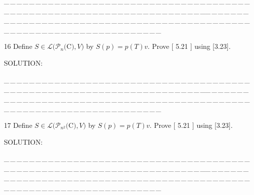 \documentclass[a4paper, 11pt, UTF8]{article}
\def\Lm{\mathcal{L}}
\def\Po{\mathcal{P}}
\begin{document}
\begin{large}
\par
{\tiny \_\,\_\,\_\,\_\,\_\,\_\,\_\,\_\,\_\,\_\,\_\,\_\,\_\,\_\,\_\,\_\,\_\,\_\,\_\,\_\,\_\,\_\,\_\,\_\,\_\,\_\,\_\,\_\,\_\,\_\,\_\,\_\,\_\,\_\,\_\,\_\,\_\,\_\,\_\,\_\,\_\,\_\,\_\,\_\,\_\,\_\,\_\,\_\,\_\,\_\,\_\,\_\,\_\,\_\,\_\,\_\,\_\,\_\,\_\,\_\,\_\,\_\,\_\,\_\,\_\,\_\,\_\,\_\,\_\,\_\,\_\_\,\_\,\_\,\_\,\_\,\_\,\_\,\_\,\_\,\_\,\_\,\_\,\_\,\_\,\_\,\_\,\_\,\_\,\_\,\_\,\_\,\_\,\_\,\_\,\_\,\_\,\_\,\_\,\_\,\_\,\_\,\_\,\_\,\_\,\_\,\_\,\_\,\_\,\_\,\_\,\_\,\_\,\_\,\_\,\_\,\_\,\_\,\_\,\_\,\_\,\_\,\_\,\_\,\_\,\_\,\_\,\_\,\_\,\_\,\_\,\_\,\_\,\_\,\_\,\_\,\_\,\_\,\_\,\_\,\_\,\_}\par

{\timesbf\Large 16} {\timessl\Large 
Define $S\in\Lm(\Po_n(${\timesbf C}$),V)$ by $S(p)=p(T)v.$ Prove $[$ 5.21 $]$ using $[$3.23$].$
}\par
{\timesbf S\footnotesize{OLUTION:}}\par\quad

\par
{\tiny \_\,\_\,\_\,\_\,\_\,\_\,\_\,\_\,\_\,\_\,\_\,\_\,\_\,\_\,\_\,\_\,\_\,\_\,\_\,\_\,\_\,\_\,\_\,\_\,\_\,\_\,\_\,\_\,\_\,\_\,\_\,\_\,\_\,\_\,\_\,\_\,\_\,\_\,\_\,\_\,\_\,\_\,\_\,\_\,\_\,\_\,\_\,\_\,\_\,\_\,\_\,\_\,\_\,\_\,\_\,\_\,\_\,\_\,\_\,\_\,\_\,\_\,\_\,\_\,\_\,\_\,\_\,\_\,\_\,\_\,\_\_\,\_\,\_\,\_\,\_\,\_\,\_\,\_\,\_\,\_\,\_\,\_\,\_\,\_\,\_\,\_\,\_\,\_\,\_\,\_\,\_\,\_\,\_\,\_\,\_\,\_\,\_\,\_\,\_\,\_\,\_\,\_\,\_\,\_\,\_\,\_\,\_\,\_\,\_\,\_\,\_\,\_\,\_\,\_\,\_\,\_\,\_\,\_\,\_\,\_\,\_\,\_\,\_\,\_\,\_\,\_\,\_\,\_\,\_\,\_\,\_\,\_\,\_\,\_\,\_\,\_\,\_\,\_\,\_\,\_\,\_}\par

{\timesbf\Large 17} {\timessl\Large 
Define $S\in\Lm(\Po_{n^2}(${\timesbf C}$),V)$ by $S(p)=p(T)v.$ Prove $[$ 5.21 $]$ using $[$3.23$].$
}\par
{\timesbf S\footnotesize{OLUTION:}}\par\quad

\par
{\tiny \_\,\_\,\_\,\_\,\_\,\_\,\_\,\_\,\_\,\_\,\_\,\_\,\_\,\_\,\_\,\_\,\_\,\_\,\_\,\_\,\_\,\_\,\_\,\_\,\_\,\_\,\_\,\_\,\_\,\_\,\_\,\_\,\_\,\_\,\_\,\_\,\_\,\_\,\_\,\_\,\_\,\_\,\_\,\_\,\_\,\_\,\_\,\_\,\_\,\_\,\_\,\_\,\_\,\_\,\_\,\_\,\_\,\_\,\_\,\_\,\_\,\_\,\_\,\_\,\_\,\_\,\_\,\_\,\_\,\_\,\_\_\,\_\,\_\,\_\,\_\,\_\,\_\,\_\,\_\,\_\,\_\,\_\,\_\,\_\,\_\,\_\,\_\,\_\,\_\,\_\,\_\,\_\,\_\,\_\,\_\,\_\,\_\,\_\,\_\,\_\,\_\,\_\,\_\,\_\,\_\,\_\,\_\,\_\,\_\,\_\,\_\,\_\,\_\,\_\,\_\,\_\,\_\,\_\,\_\,\_\,\_\,\_\,\_\,\_\,\_\,\_\,\_\,\_\,\_\,\_\,\_\,\_\,\_\,\_\,\_\,\_\,\_\,\_\,\_\,\_\,\_}\par




\end{large}
\end{document}
